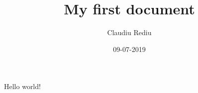 \documentclass{article}
\title{My first document}
\date{09-07-2019}
\author{Claudiu Rediu}
\begin{document}
	\maketitle
	\newpage
	
	Hello world!
\end{document}
